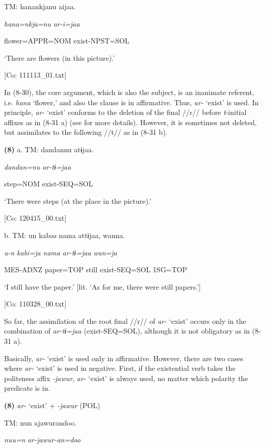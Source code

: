   TM:  hanankjanu  aijaa.

    \textit{hana=nkja=nu}  \textit{ar{}-i=jaa}

    flower=APPR=NOM  exist-NPST=SOL

    ‘There are flowers (in this picture).’

    [Co: 111113\_01.txt]

In (8-30), the core argument, which is also the subject, is an inanimate referent, i.e. \textit{hana} ‘flower,’ and also the clause is in affirmative. Thus, \textit{ar-} ‘exist’ is used. In principle, \textit{ar-} ‘exist’ conforms to the deletion of the final //r// before \textit{t}{}-initial affixes as in (8-31 a) (see  for more details). However, it is sometimes not deleted, but assimilates to the following //t// as in (8-31 b).

\textbf{(8)}  a.  TM:  dandannu  atɨjaa.

      \textit{dandan=nu}  \textit{ar-tɨ=jaa}

      step=NOM  exist-SEQ=SOL

      ‘There were steps (at the place in the picture).’

      [Co: 120415\_00.txt]

  b.  TM:  un  kabəə  nama  attɨjaa,  wanna.

      \textit{u-n}  \textit{kabi=ja}  \textit{nama}  \textit{ar-tɨ=jaa}  \textit{wan=ja}

      MES-ADNZ  paper=TOP  still  exist-SEQ=SOL  1SG=TOP

      ‘I still have the paper.’ [lit. ‘As for me, there were still papers.’]

      [Co: 110328\_00.txt]

So far, the assimilation of the root final //r// of \textit{ar-} ‘exist’ occurs only in the combination of \textit{ar-tɨ=jaa} (exist-SEQ=SOL), although it is not obligatory as in (8-31 a).

  Basically, \textit{ar-} ‘exist’ is used only in affirmative. However, there are two cases where \textit{ar-} ‘exist’ is used in negative. First, if the existential verb takes the politeness affix \textit{{}-jawur}, \textit{ar-} ‘exist’ is always used, no matter which polarity the predicate is in.

\textbf{(8)}  \textit{ar-} ‘exist’ + \textit{{}-jawur} (POL)

  TM:  nun  ajawurandoo.

    \textit{nuu=n}  \textit{ar-jawur-an=doo}

